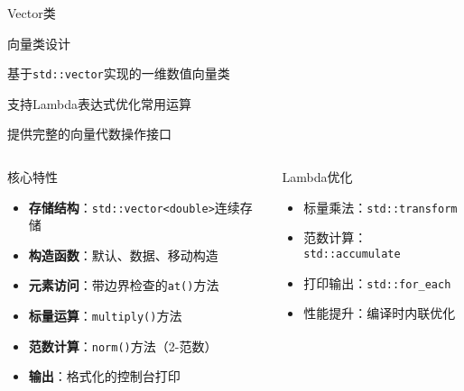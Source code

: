 \documentclass[UTF8,aspectratio=169]{beamer}
\begin{document}
\begin{frame}{Vector类}
    \begin{ytublock}{向量类设计}
        \item 基于\texttt{std::vector}实现的一维数值向量类
        \item 支持Lambda表达式优化常用运算
        \item 提供完整的向量代数操作接口
    \end{ytublock}

    \begin{columns}
        \begin{block}{核心特性}
            \begin{itemize}
                \item \textbf{存储结构}：\texttt{std::vector<double>}连续存储
                \item \textbf{构造函数}：默认、数据、移动构造
                \item \textbf{元素访问}：带边界检查的\texttt{at()}方法
                \item \textbf{标量运算}：\texttt{multiply()}方法
                \item \textbf{范数计算}：\texttt{norm()}方法（2-范数）
                \item \textbf{输出}：格式化的控制台打印
            \end{itemize}
        \end{block}

        \begin{block}{Lambda优化}
            \begin{itemize}
                \item 标量乘法：\texttt{std::transform}
                \item 范数计算：\texttt{std::accumulate}
                \item 打印输出：\texttt{std::for\_each}
                \item 性能提升：编译时内联优化
            \end{itemize}
        \end{block}
    \end{columns}
\end{frame}
\end{document}
